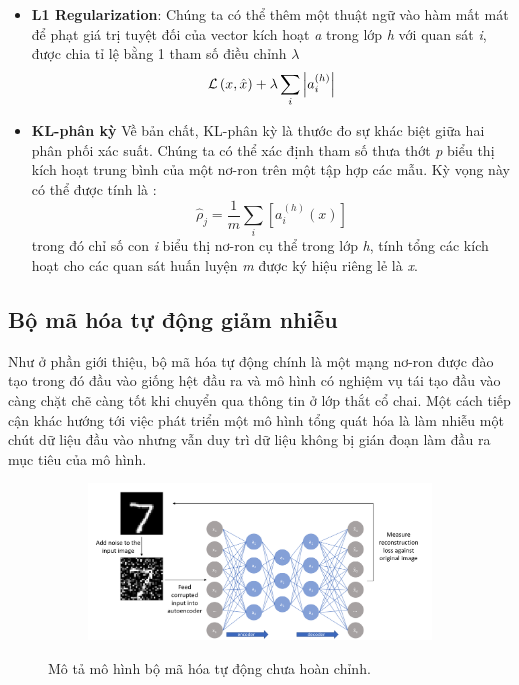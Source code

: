 \begin{itemize}[leftmargin=1.5cm]
    \item \textbf{L1 Regularization}: Chúng ta có thể thêm một thuật ngữ vào hàm mất mát
          để phạt giá trị tuyệt đối của vector kích hoạt \textit{a} trong lớp \textit{h} với quan sát \textit{i}, được chia tỉ lệ
          bằng 1 tham số điều chỉnh \textit{$\lambda$}
          \begin{equation}
              {\cal L}\left( {x,\hat x} \right) +  \lambda \sum\limits_i {\left| {a_i^{\left( h \right)}} \right|}
          \end{equation}
    \item \textbf{KL-phân kỳ} Về bản chất, KL-phân kỳ là thước đo sự
          khác biệt giữa hai phân phối xác suất. Chúng ta có thể xác định
          tham số thưa thớt \textit{p} biểu thị kích hoạt trung bình của
          một nơ-ron trên một tập hợp các mẫu. Kỳ vọng này có thể được tính là :
          \begin{equation}
              {{\hat \rho }_ j} = \frac{1}{m}\sum\limits_{i} {\left[ {a_i^{\left( h \right)}\left( x \right)} \right]}
          \end{equation}
          trong đó chỉ số con \textit{i} biểu thị nơ-ron cụ thể trong lớp \textit{h}, tính tổng các kích hoạt
          cho các quan sát huấn luyện \textit{m} được ký hiệu riêng lẻ là \textit{x}.

\end{itemize}

\subsection{Bộ mã hóa tự động giảm nhiễu}

Như ở phần giới thiệu, bộ mã hóa tự động chính là một mạng
nơ-ron được đào tạo
trong đó đầu vào giống hệt đầu ra và mô hình có nghiệm vụ tái
tạo đầu vào càng
chặt chẽ càng tốt khi chuyển qua thông tin ở lớp thắt cổ chai.
Một cách tiếp cận khác hướng tới việc phát triển một mô hình
tổng quát hóa là làm nhiễu một chút dữ liệu đầu vào nhưng vẫn
duy trì dữ liệu không bị gián đoạn làm đầu ra mục tiêu của mô hình.

\begin{figure}
    \begin{subfigure}{0.8\textwidth}
        \includegraphics[width=1.\linewidth]{Chapters/items/auto5.jpg}
        \caption{}
        \label{fig: auto5}
    \end{subfigure}
    \caption{Mô tả mô hình bộ mã hóa tự động chưa hoàn chỉnh.}
\end{figure}

